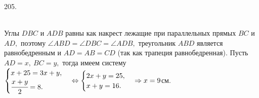 205. \begin{figure}[ht!]
\end{figure}\\
Углы $DBC$ и $ADB$ равны как накрест лежащие при параллельных прямых $BC$ и $AD,$ поэтому $\angle ABD=\angle DBC=\angle ADB,$ треугольник $ABD$ является равнобедренным и $AD=AB=CD$ (так как трапеция равнобедренная). Пусть $AD=x,\ BC=y,$ тогда имеем систему\\ $\begin{cases} x+25=3x+y,\\ \cfrac{x+y}{2}=8. \end{cases}
\Leftrightarrow  \begin{cases} 2x+y=25,\\ x+y=16. \end{cases} \Rightarrow x=9$см.\\
